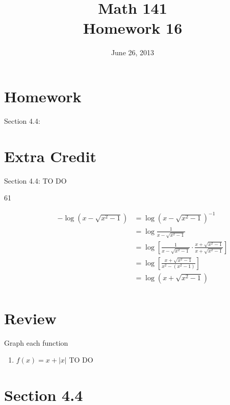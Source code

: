 \documentclass{exam}
\date{June 26, 2013}
\author{}
\title{Math 141 \\ Homework 16}
\begin{document}
  \maketitle

  \section{Homework}

  Section 4.4: 

  \ifprintanswers
    \pagebreak
  \fi

  \section{Extra Credit}
  Section 4.4: TO DO

  \ifprintanswers
    \begin{description}
      \item[61]
        \begin{align*}
          - \log(x - \sqrt{x^2 - 1}) &= \log(x - \sqrt{x^2 - 1})^{-1} \\
                                     &= \log \frac{1}{x - \sqrt{x^2 - 1}} \\
                                     &= \log \left[ \frac{1}{x - \sqrt{x^2 - 1}} \cdot \frac{x + \sqrt{x^2 - 1}}{x + \sqrt{x^2 - 1}} \right] \\
                                     &= \log \left[ \frac{x + \sqrt{x^2 - 1}}{x^2 - (x^2 - 1)} \right] \\
                                     &= \log ( x + \sqrt{x^2 - 1} ) \\
        \end{align*}

    \end{description}
  \fi

  \ifprintanswers
    \pagebreak
  \fi

  \section{Review}

  Graph each function
  \begin{enumerate}

    \item $f(x) = x + |x|$ 
      \ifprintanswers
        TO DO
      \fi

  \end{enumerate}

  \ifprintanswers
    \section{Section 4.4}
\end{document}

